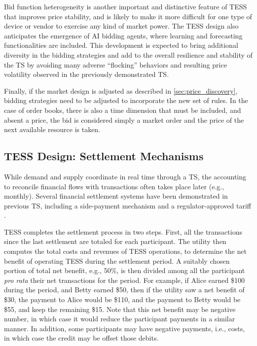 Bid function heterogeneity is another important and distinctive feature of TESS that improves price stability, and is likely to make it more difficult for one type of device or vendor to exercise any kind of market power.
The TESS design also anticipates the emergence of AI bidding agents, where learning and forecasting functionalities are included. This development is expected to bring additional diversity in the bidding strategies and add to the overall resilience and stability of the TS by avoiding many adverse ``flocking'' behaviors and resulting price volatility observed in the previously demonstrated TS.

Finally, if the market design is adjusted as described in \cref{sec:price_discovery}, bidding strategies need to be adjusted to incorporate the new set of rules.
In the case of order books, there is also a time dimension that must be included, and absent a price, the bid is considered simply a market order and the price of the next available resource is taken.

\subsection{TESS Design: Settlement Mechanisms}\label{sec:settlement}

While demand and supply coordinate in real time through a TS, the accounting to reconcile financial flows with transactions often takes place later (e.g., monthly). Several financial settlement systems have been demonstrated in previous TS, including a side-payment mechanism \citep{hammerstrom_2008} and a regulator-approved tariff \citep{Widergren2014}. 

TESS completes the settlement process in two steps. First, all the transactions since the last settlement are totaled for each participant. The utility then computes the total costs and revenues of TESS operations, to determine the net benefit of operating TESS during the settlement period.  A suitably chosen portion of total net benefit, e.g., 50\%, is then divided among all the participant \textit{pro rata} their net transactions for the period.  For example, if Alice earned \$100 during the period, and Betty earned \$50, then if the utility saw a net benefit of \$30, the payment to Alice would be \$110, and the payment to Betty would be \$55, and keep the remaining \$15. Note that this net benefit may be negative number, in which case it would reduce the participant payments in a similar manner. In addition, some participants may have negative payments, i.e., costs, in which case the credit may be offset those debits. 

